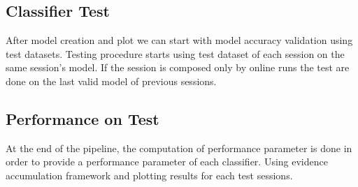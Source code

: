 \subsection{Classifier Test}\label{subsec:status}
After model creation and plot we can start with model accuracy validation using test datasets. Testing procedure starts using test dataset of each session on the same session's model. If the session is composed only by online runs the test are done on the last valid model of previous sessions. 
\subsection{Performance on Test}\label{subsec:status}
At the end of the pipeline, the computation of performance parameter is done in order to provide a performance parameter of each classifier. Using evidence accumulation framework and plotting results for each test sessions.







